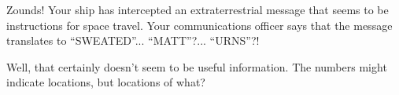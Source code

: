 Zounds! Your ship has intercepted an extraterrestrial message that seems 
to be instructions for space travel.
Your communications officer says that the message translates
to ``SWEATED''... ``MATT''?... ``URNS''?!

Well, that certainly doesn't seem to be useful information.  
The numbers might indicate locations, but locations of what?
